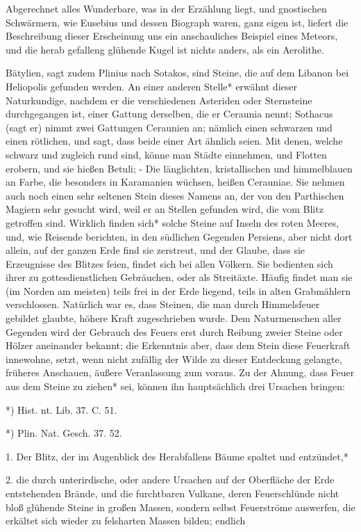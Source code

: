 \documentclass[a4paper, 11pt, oneside, polutonikogreek, german]{article}
\begin{document}
Abgerechnet alles Wunderbare, was in der Erzählung liegt, und gnostischen Schwärmern, wie Eusebius und dessen Biograph waren, ganz eigen ist, liefert die Beschreibung dieser Erscheinung uns ein anschauliches Beispiel eines Meteors, und die herab gefalleng glühende Kugel ist nichts anders, als ein Aerolithe.

Bätylien, sagt zudem Plinius nach Sotakos, sind Steine, die auf dem Libanon bei Heliopolis gefunden werden. An einer anderen Stelle* erwähnt dieser Naturkundige, nachdem er die verschiedenen Asteriden oder Sternsteine durchgegangen ist, einer Gattung derselben, die er Ceraunia nennt; Sothacus (sagt er) nimmt zwei Gattungen Ceraunien an; nämlich einen schwarzen und einen rötlichen, und sagt, dass beide einer Art ähnlich seien. Mit denen, welche schwarz und zugleich rund sind, könne man Städte einnehmen, und Flotten erobern, und sie hießen Betuli; - Die länglichten, kristallischen und himmelblauen an Farbe, die besonders in Karamanien wüchsen, heißen Cerauniae. Sie nehmen auch noch einen sehr seltenen Stein dieses Namens an, der von den Parthischen Magiern sehr gesucht wird, weil er an Stellen gefunden wird, die vom Blitz getroffen sind. Wirklich finden sich* solche Steine auf Inseln des roten Meeres, und, wie Reisende berichten, in den südlichen Gegenden Persiens, aber nicht dort allein, auf der ganzen Erde find sie zerstreut, und der Glaube, dass sie Erzeugnisse des Blitzes feien, findet sich bei allen Völkern. Sie bedienten sich ihrer zu gottesdienstlichen Gebräuchen, oder als Streitäxte. Häufig findet man sie (im Norden am meisten) teils frei in der Erde liegend, teils in alten Grabmählern verschlossen. Natürlich war es, dass Steinen, die man durch Himmelsfeuer gebildet glaubte, höhere Kraft zugeschrieben wurde. Dem Naturmenschen aller Gegenden wird der Gebrauch des Feuers erst durch Reibung zweier Steine oder Hölzer aneinander bekannt; die Erkenntnis aber, dass dem Stein diese Feuerkraft innewohne, setzt, wenn nicht zufällig der Wilde zu dieser Entdeckung gelangte, früheres Anschauen, äußere Veranlassung zum voraus. Zu der Ahnung, dass Feuer aus dem Steine zu ziehen* sei, können ihn hauptsächlich drei Ursachen bringen:

*) Hist. nt. Lib. 37. C. 51.

*) Plin. Nat. Gesch. 37. 52.

1. Der Blitz, der im Augenblick des Herabfallens Bäume spaltet und entzündet,*

2. die durch unterirdische, oder andere Ursachen auf der Oberfläche der Erde entstehenden Brände, und die furchtbaren Vulkane, deren Feuerschlünde nicht bloß glühende Steine in großen Massen, sondern selbst Feuerströme auswerfen, die erkältet sich wieder zu felsharten Massen bilden; endlich
\end{document}
